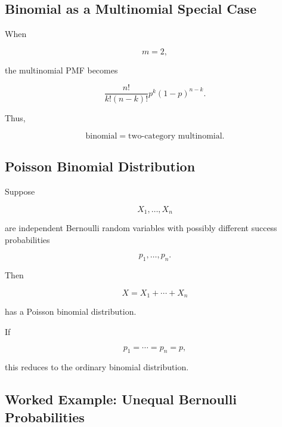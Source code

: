 \subsection{Binomial as a Multinomial Special Case}
\label{subsec:binomial-multinomial-special}

When

\[
m=2,
\]

the multinomial PMF becomes

\[
\frac{n!}{k!(n-k)!}
p^k(1-p)^{n-k}.
\]

Thus,

\[
\boxed{
\text{binomial}
=
\text{two-category multinomial}.
}
\]

\subsection{Poisson Binomial Distribution}
\label{subsec:poisson-binomial}

Suppose

\[
X_1,\ldots,X_n
\]

are independent Bernoulli random variables with possibly different
success probabilities

\[
p_1,\ldots,p_n.
\]

Then

\[
X
=
X_1+\cdots+X_n
\]

has a Poisson binomial distribution.

If

\[
p_1=\cdots=p_n=p,
\]

this reduces to the ordinary binomial distribution.

\subsection{Worked Example: Unequal Bernoulli Probabilities}
\label{subsec:worked-poisson-binomial}

